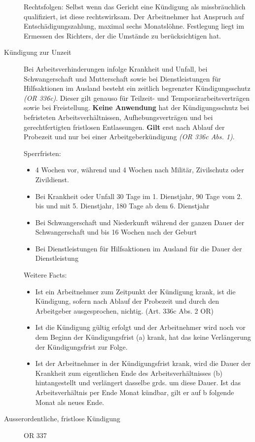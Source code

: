 \begin{description}
  Rechtsfolgen: Selbst wenn das Gericht eine Kündigung als missbräuchlich qualifiziert, ist diese rechtswirksam. Der Arbeitnehmer hat Anspruch auf Entschädigungszahlung, maximal sechs Monatslöhne. Festlegung liegt im Ermessen des Richters, der die Umstände zu berücksichtigen hat. 

  \item[Kündigung zur Unzeit] Bei Arbeitsverhinderungen infolge Krankheit und
Unfall, bei Schwangerschaft und Mutterschaft sowie bei Dienstleistungen für Hilfsaktionen
im Ausland besteht ein zeitlich begrenzter Kündigungsschutz \textit{(OR 336c)}. Dieser gilt genauso für Teilzeit- und Temporärarbeitsverträgen sowie bei Freistellung.
\textbf{Keine Anwendung} hat der Kündigungsschutz bei befristeten Arbeitsverhältnissen, Aufhebungsverträgen und bei gerechtfertigten fristlosen Entlassungen.
\textbf{Gilt} erst nach Ablauf der Probezeit und nur bei einer Arbeitgeberkündigung \textit{(OR 336c Abs. 1)}.

Sperrfristen: 
\begin{itemize}
  \item 4 Wochen vor, während und 4 Wochen nach Militär, Zivilschutz oder Zivildienst. 
  \item Bei Krankheit oder Unfall 30 Tage im 1. Dienstjahr, 90 Tage vom 2. bis und mit 5. Dienstjahr, 180 Tage ab dem 6. Dienstjahr
  \item Bei Schwangerschaft und Niederkunft während der ganzen Dauer der Schwangerschaft und bis 16 Wochen nach der Geburt
  \item Bei Dienstleistungen für Hilfsaktionen im Ausland für die Dauer der Dienstleistung
\end{itemize}
Weitere Facts: 
\begin{itemize}
  \item Ist ein Arbeitnehmer zum Zeitpunkt der Kündigung krank, ist die Kündigung, sofern nach Ablauf der Probezeit und durch den Arbeitgeber ausgesprochen, nichtig. (Art. 336c Abs. 2 OR)
  \item Ist die Kündigung gültig erfolgt und der Arbeitnehmer wird noch vor dem Beginn der Kündigungsfrist (a) krank, hat das keine Verlängerung der Kündigungsfrist zur Folge.
  \item Ist der Arbeitnehmer in der Kündigungsfrist krank, wird die Dauer der Krankheit zum eigentlichen Ende des Arbeitsverhältnisses (b) hintangestellt und verlängert dasselbe grds. um diese Dauer. Ist das Arbeitsverhältnis per Ende Monat kündbar, gilt er auf b folgende Monat als neues Ende.
\end{itemize}
\item[Ausserordentliche, fristlose Kündigung] OR 337


\end{description}
